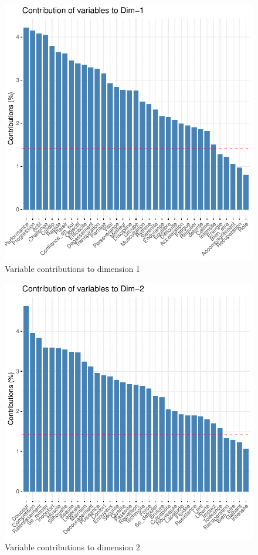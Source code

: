 \documentclass[12pt]{article}
\begin{document}
\begin{figure}[H]
\begin{center}
\includegraphics[scale=1.1]{ACP_1.pdf} 
\caption[]{ Variable contributions to  dimension 1 }
\end{center}
\end{figure}

\begin{figure}[H]
\begin{center}
\includegraphics[scale=1.1]{ACP_2.pdf} 
\caption[]{ Variable contributions to  dimension 2 }
\end{center}
\end{figure}
\end{document}
